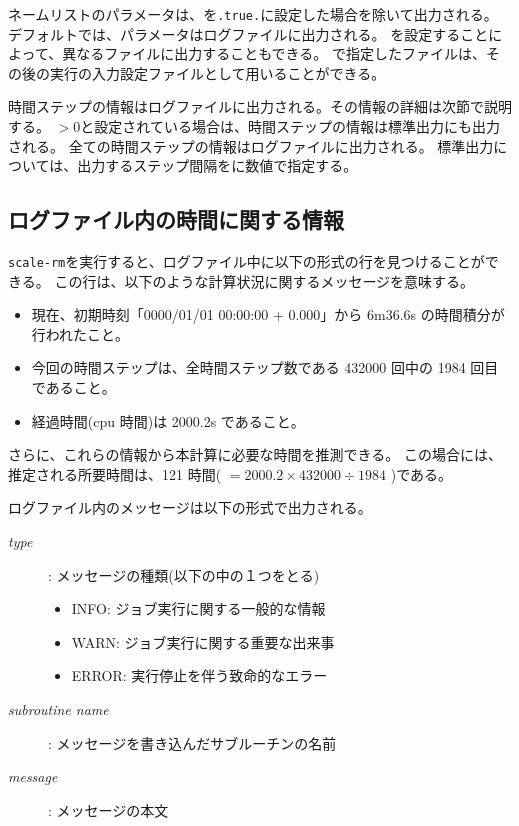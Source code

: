 ネームリストのパラメータは、を\verb|.true.|に設定した場合を除いて出力される。
デフォルトでは、パラメータはログファイルに出力される。
を設定することによって、異なるファイルに出力することもできる。
で指定したファイルは、その後の実行の入力設定ファイルとして用いることができる。

時間ステップの情報はログファイルに出力される。その情報の詳細は次節で説明する。
$>0$と設定されている場合は、時間ステップの情報は標準出力にも出力される。
全ての時間ステップの情報はログファイルに出力される。
標準出力については、出力するステップ間隔をに数値で指定する。


\subsection{ログファイル内の時間に関する情報}

\verb|scale-rm|を実行すると、ログファイル中に以下の形式の行を見つけることができる。
この行は、以下のような計算状況に関するメッセージを意味する。
\begin{itemize}
 \item 現在、初期時刻「0000/01/01 00:00:00 + 0.000」から 6m36.6s の時間積分が行われたこと。
 \item 今回の時間ステップは、全時間ステップ数である 432000 回中の 1984 回目であること。
 \item 経過時間(cpu 時間)は 2000.2s であること。
\end{itemize}
さらに、これらの情報から本計算に必要な時間を推測できる。
この場合には、推定される所要時間は、121 時間( $= 2000.2 \times 432000 \div 1984$ )である。

\vspace{2ex}
ログファイル内のメッセージは以下の形式で出力される。
\begin{description}
 \item[{\it type}]: メッセージの種類(以下の中の１つをとる)
   \begin{itemize}
    \item INFO: ジョブ実行に関する一般的な情報
    \item WARN: ジョブ実行に関する重要な出来事
    \item ERROR: 実行停止を伴う致命的なエラー
   \end{itemize}
 \item[{\it subroutine name}]: メッセージを書き込んだサブルーチンの名前
 \item[{\it message}]: メッセージの本文
\end{description}


